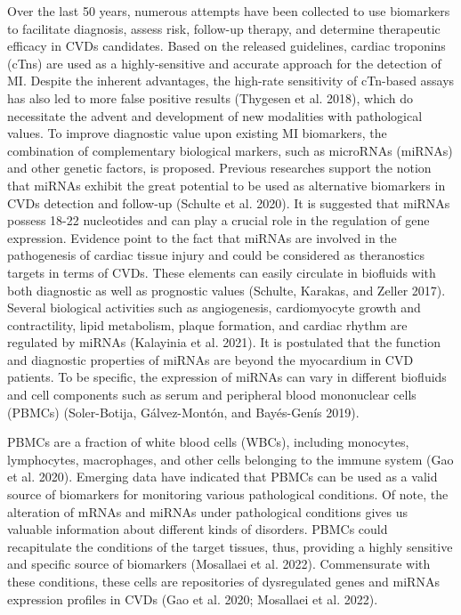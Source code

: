 \documentclass[smallextended]{svjour3}       %
\begin{document}
Over the last 50 years, numerous attempts have been collected to use
biomarkers to facilitate diagnosis, assess risk, follow-up therapy, and
determine therapeutic efficacy in CVDs candidates. Based on the released
guidelines, cardiac troponins (cTns) are used as a highly-sensitive and
accurate approach for the detection of MI. Despite the inherent
advantages, the high-rate sensitivity of cTn-based assays has also led
to more false positive results (Thygesen et al. 2018), which do
necessitate the advent and development of new modalities with
pathological values. To improve diagnostic value upon existing MI
biomarkers, the combination of complementary biological markers, such as
microRNAs (miRNAs) and other genetic factors, is proposed. Previous
researches support the notion that miRNAs exhibit the great potential to
be used as alternative biomarkers in CVDs detection and follow-up
(Schulte et al. 2020). It is suggested that miRNAs possess 18-22
nucleotides and can play a crucial role in the regulation of gene
expression. Evidence point to the fact that miRNAs are involved in the
pathogenesis of cardiac tissue injury and could be considered as
theranostics targets in terms of CVDs. These elements can easily
circulate in biofluids with both diagnostic as well as prognostic values
(Schulte, Karakas, and Zeller 2017). Several biological activities such
as angiogenesis, cardiomyocyte growth and contractility, lipid
metabolism, plaque formation, and cardiac rhythm are regulated by miRNAs
(Kalayinia et al. 2021). It is postulated that the function and
diagnostic properties of miRNAs are beyond the myocardium in CVD
patients. To be specific, the expression of miRNAs can vary in different
biofluids and cell components such as serum and peripheral blood
mononuclear cells (PBMCs) (Soler-Botija, Gálvez-Montón, and Bayés-Genís
2019).

PBMCs are a fraction of white blood cells (WBCs), including monocytes,
lymphocytes, macrophages, and other cells belonging to the immune system
(Gao et al. 2020). Emerging data have indicated that PBMCs can be used
as a valid source of biomarkers for monitoring various pathological
conditions. Of note, the alteration of mRNAs and miRNAs under
pathological conditions gives us valuable information about different
kinds of disorders. PBMCs could recapitulate the conditions of the
target tissues, thus, providing a highly sensitive and specific source
of biomarkers (Mosallaei et al. 2022). Commensurate with these
conditions, these cells are repositories of dysregulated genes and
miRNAs expression profiles in CVDs (Gao et al. 2020; Mosallaei et al.
2022).
\end{document}

